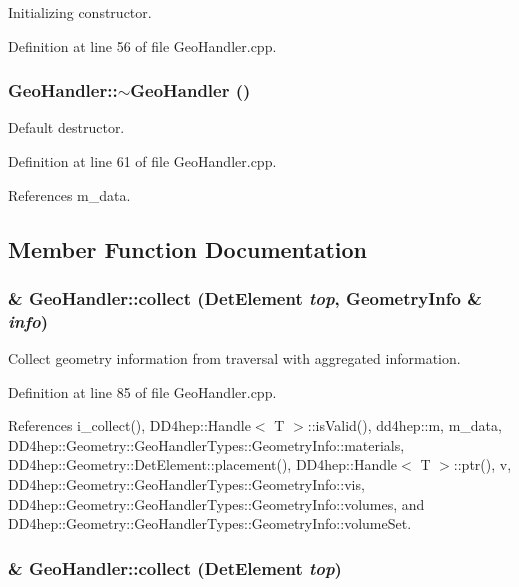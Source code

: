 Initializing constructor. 

Definition at line 56 of file GeoHandler.cpp.\hypertarget{class_d_d4hep_1_1_geometry_1_1_geo_handler_abb339356d911217c99b0869573d5284f}{
\subsubsection[{$\sim$GeoHandler}]{\setlength{\rightskip}{0pt plus 5cm}GeoHandler::$\sim$GeoHandler ()}}
\label{class_d_d4hep_1_1_geometry_1_1_geo_handler_abb339356d911217c99b0869573d5284f}


Default destructor. 

Definition at line 61 of file GeoHandler.cpp.

References m\_\-data.

\subsection{Member Function Documentation}
\hypertarget{class_d_d4hep_1_1_geometry_1_1_geo_handler_a807765ba56e60835ab300a906d008f07}{
\subsubsection[{collect}]{ \& GeoHandler::collect ({\bf DetElement} {\em top}, \/  {\bf GeometryInfo} \& {\em info})}}
\label{class_d_d4hep_1_1_geometry_1_1_geo_handler_a807765ba56e60835ab300a906d008f07}


Collect geometry information from traversal with aggregated information. 

Definition at line 85 of file GeoHandler.cpp.

References i\_\-collect(), DD4hep::Handle$<$ T $>$::isValid(), dd4hep::m, m\_\-data, DD4hep::Geometry::GeoHandlerTypes::GeometryInfo::materials, DD4hep::Geometry::DetElement::placement(), DD4hep::Handle$<$ T $>$::ptr(), v, DD4hep::Geometry::GeoHandlerTypes::GeometryInfo::vis, DD4hep::Geometry::GeoHandlerTypes::GeometryInfo::volumes, and DD4hep::Geometry::GeoHandlerTypes::GeometryInfo::volumeSet.\hypertarget{class_d_d4hep_1_1_geometry_1_1_geo_handler_acdff622f718b2f71d40744f4665b80e9}{
\subsubsection[{collect}]{ \& GeoHandler::collect ({\bf DetElement} {\em top})}}
\label{class_d_d4hep_1_1_geometry_1_1_geo_handler_acdff622f718b2f71d40744f4665b80e9}


